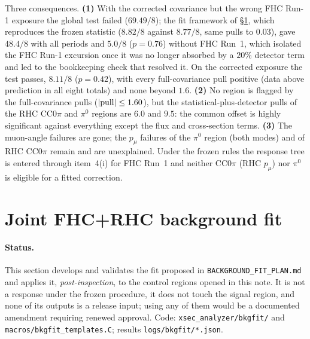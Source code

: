 \documentclass[11pt,a4paper]{article}
\begin{document}
Three consequences. \textbf{(1)} With the corrected covariance but the wrong FHC Run-1 exposure the global
test failed ($69.49/8$); the fit framework of \S\ref{sec:jointfit}, which reproduces the frozen statistic
($8.82/8$ against $8.77/8$, same pulls to $0.03$), gave $48.4/8$ with all periods and $5.0/8$ ($p=0.76$) without
FHC Run~1, which isolated the FHC Run-1 excursion once it was no longer absorbed by a $20\%$ detector term and
led to the bookkeeping check that resolved it. On the corrected exposure the test passes, $8.11/8$ ($p=0.42$),
with every full-covariance pull positive (data above prediction in all eight totals) and none beyond $1.6$. \textbf{(2)} No region is flagged
by the full-covariance pulls ($|{\rm pull}|\le1.60$), but the statistical-plus-detector pulls of the RHC CC$0\pi$
and $\pi^0$ regions are $6.0$ and $9.5$: the common offset is highly significant against everything except the
flux and cross-section terms. \textbf{(3)} The muon-angle failures are gone; the $p_\mu$ failures of the $\pi^0$
region (both modes) and of RHC CC$0\pi$ remain and are unexplained. Under the frozen rules the response tree is
entered through item~4(i) for FHC Run~1 and neither CC$0\pi$ (RHC $p_\mu$) nor $\pi^0$ is eligible for a fitted
correction.

\section{Joint FHC+RHC background fit}
\label{sec:jointfit}

\paragraph{Status.} This section develops and validates the fit proposed in \texttt{BACKGROUND\_FIT\_PLAN.md} and
applies it, \emph{post-inspection}, to the control regions opened in this note. It is not a response under the
frozen procedure, it does not touch the signal region, and none of its outputs is a release input; using any of
them would be a documented amendment requiring renewed approval. Code: \texttt{xsec\_analyzer/bkgfit/} and
\texttt{macros/bkgfit\_templates.C}; results \texttt{logs/bkgfit/*.json}.
\end{document}
